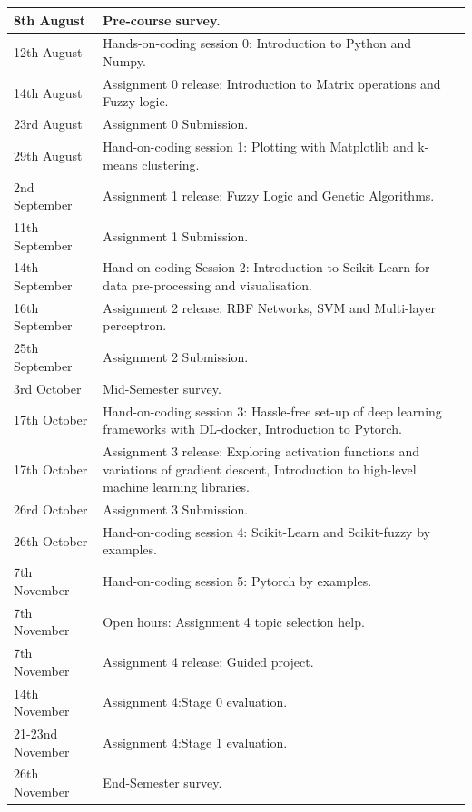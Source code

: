 \documentclass{article} %
\begin{document}
\vspace{0.5cm}

\begin{tabular}{ | p{10em} || p{25em} | }
\hline
8th August & Pre-course survey. \\
\hline
12th August & Hands-on-coding session 0: Introduction to
             Python and Numpy.\\
\hline
14th August & Assignment 0 release: Introduction to Matrix operations
                            and Fuzzy logic. \\
\hline
23rd August & Assignment 0 Submission. \\
\hline
29th August & Hand-on-coding session 1: Plotting with Matplotlib and k-means clustering. \\
\hline
2nd September & Assignment 1 release: Fuzzy Logic and Genetic Algorithms. \\
\hline
11th September & Assignment 1 Submission.\\
\hline
14th September & Hand-on-coding Session 2: Introduction to Scikit-Learn for data pre-processing and visualisation. \\
\hline
16th September & Assignment 2 release: RBF Networks, SVM and Multi-layer perceptron.\\
\hline
25th September & Assignment 2 Submission.\\
\hline
3rd October & Mid-Semester survey.\\
\hline
17th October & Hand-on-coding session 3: Hassle-free set-up of deep learning frameworks with DL-docker, Introduction to Pytorch.\\
\hline
17th October & Assignment 3 release: Exploring activation functions and variations of gradient descent,
                                     Introduction to high-level machine learning libraries. \\
\hline
26rd October & Assignment 3 Submission. \\
\hline
26th October & Hand-on-coding session 4: Scikit-Learn and Scikit-fuzzy by examples.\\
\hline
7th November & Hand-on-coding session 5: Pytorch by examples.\\
\hline
7th November & Open hours: Assignment 4 topic selection help.\\
\hline
7th November & Assignment 4 release: Guided project.\\
\hline
14th November & Assignment 4:Stage 0 evaluation.\\
\hline
21-23nd November & Assignment 4:Stage 1 evaluation.\\
\hline
26th November & End-Semester survey.\\
\hline
\end{tabular}
\end{document}
